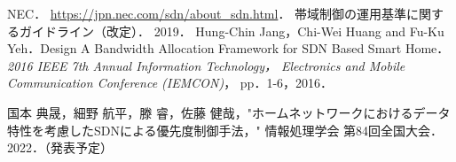 \documentclass[a4paper,11pt,uplatex]{ujreport}
\begin{document}
\renewcommand{\bibname}{参考文献}

\begin{thebibliography}{99}
   NEC． \url{https://jpn.nec.com/sdn/about_sdn.html}．
   帯域制御の運用基準に関するガイドライン（改定）． 2019．
   Hung-Chin Jang，Chi-Wei Huang and Fu-Ku Yeh．Design
  A Bandwidth Allocation Framework for SDN Based Smart
  Home．\textit{2016 IEEE 7th Annual Information Technology，
  Electronics and Mobile Communication Conference (IEMCON)}，
  pp．1-6，2016．
\end{thebibliography}

% 
% 

\label{chap:Bibiliography}

\renewcommand{\bibname}{研究業績}

\begin{thebibliography}{99}
  \bibitem{} 国本 典晟，細野 航平，滕 睿，佐藤 健哉，"ホームネットワークにおけるデータ特性を考慮したSDNによる優先度制御手法，" 情報処理学会 第84回全国大会．2022．（発表予定）
\end{thebibliography}

\label{chap:Publications}

\end{document}
